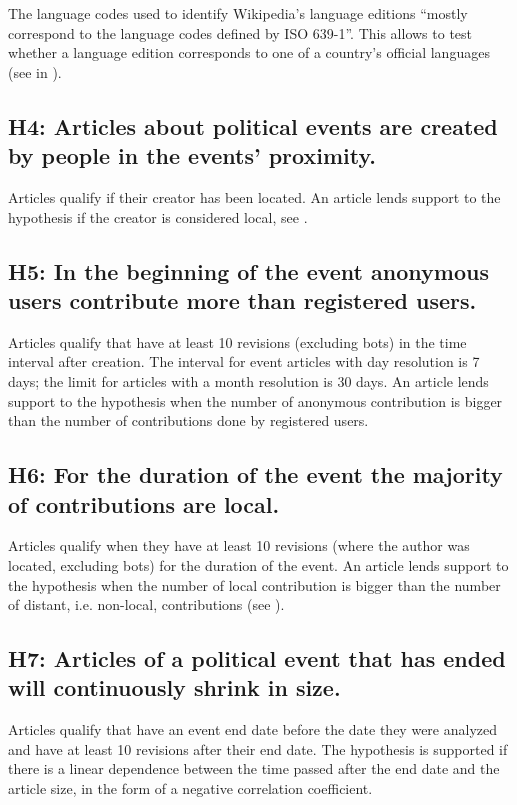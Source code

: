 The language codes used to identify Wikipedia's language editions ``mostly correspond to the language codes defined by \ac{ISO} 639-1''.\cite{wplist} 
This allows to test whether a language edition corresponds to one of a country's official languages (see  in ).

\subsection*{H4: Articles about political events are created by people in the events' proximity.}

Articles qualify if their creator has been located.
An article lends support to the hypothesis if the creator is considered local, see .

\subsection*{H5: In the beginning of the event anonymous users contribute more than registered users.}

Articles qualify that have at least 10 revisions (excluding bots) in the time interval after creation.
The interval for event articles with day resolution is 7 days; the limit for articles with a month resolution is 30 days.
An article lends support to the hypothesis when the number of anonymous contribution is bigger than the number of contributions done by registered users.

\subsection*{H6: For the duration of the event the majority of contributions are local.}

Articles qualify when they have at least 10 revisions (where the author was located, excluding bots) for the duration of the event.
An article lends support to the hypothesis when the number of local contribution is bigger than the number of distant, i.e. non-local, contributions (see ).

\subsection*{H7: Articles of a political event that has ended will continuously shrink in size.}

Articles qualify that have an event end date before the date they were analyzed and have at least 10 revisions after their end date.
The hypothesis is supported if there is a linear dependence between the time passed after the end date and the article size, in the form of a negative correlation coefficient.

